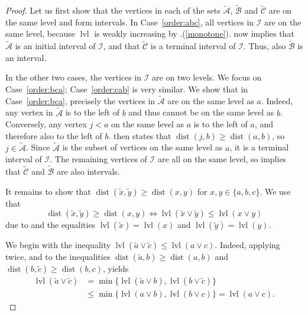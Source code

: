 \documentclass[a4paper]{amsart}
\theoremstyle{definition}
\theoremstyle{remark}
\numberwithin{equation}{theorem}
\newcommand{\dist}{\operatorname{dist}}
\newcommand{\level}{\operatorname{lvl}}
\begin{document}
\begin{proof}
    Let us first show that the vertices in each of the sets $\tilde{\mathcal A}$, $\tilde{\mathcal B}$ and $\tilde{\mathcal C}$ are on the same level and form intervals.  In Case~\ref{order:abc}, all vertices in $\mathcal I$ are on the same level, because $\level$ is weakly increasing by .(\ref{monotone}).  now implies that $\tilde{\mathcal A}$ is an initial interval of $\mathcal I$, and that $\tilde{\mathcal C}$ is a terminal interval of $\mathcal I$.  Thus, also $\tilde{\mathcal B}$ is an interval.

    In the other two cases, the vertices in $\mathcal I$ are on two levels.  We focus on Case~\ref{order:bca}; Case~\ref{order:cab} is very similar.  We show that in Case~\ref{order:bca}, precisely the vertices in $\tilde{\mathcal A}$ are on the same level as $a$.  Indeed, any vertex in $\tilde{\mathcal A}$ is to the left of $b$
    and thus cannot be on the same level as $b$.  Conversely, any vertex $j < a$ on the same level as $a$ is to the left of $a$, and therefore also to the left of $b$.  then states that $\dist(j, b)\geq \dist(a, b)$, so $j\in\tilde{\mathcal A}$.  Since $\tilde{\mathcal A}$ is the subset of vertices on the same level as $a$, it is a terminal interval of $\mathcal I$.  The remaining vertices of $\mathcal I$ are all on the same level, so  implies that $\tilde{\mathcal C}$ and $\tilde{\mathcal B}$ are also intervals.

    It remains to show that $\dist(\tilde x, \tilde y)\geq\dist(x, y)$ for $x,y\in\{a,b,c\}$.  We use that
  \[
  \dist(\tilde x, \tilde y)\geq\dist(x, y) \Longleftrightarrow \level(\tilde x\vee\tilde y)\leq\level(x\vee y)
  \]
    due to  and the equalities $ \level( \tilde x ) = \level( x )$ and $ \level( \tilde y ) = \level( y )$.

    We begin with the inequality $\level(\tilde a\vee\tilde c)\leq\level(a\vee c)$.  Indeed, applying  twice, and  to the inequalities $\dist(\tilde a, b)\geq\dist(a,b)$ and $\dist(b, \tilde c)\geq\dist(b,c)$, yields
  \begin{align*}
    \level(\tilde a\vee\tilde c)&=\min\{\level(\tilde a\vee b), \level(b\vee\tilde c)\}\\
    &\leq\min\{\level(a\vee b), \level(b\vee c)\} = \level(a\vee c).
  \end{align*}


\end{proof}
\end{document}
